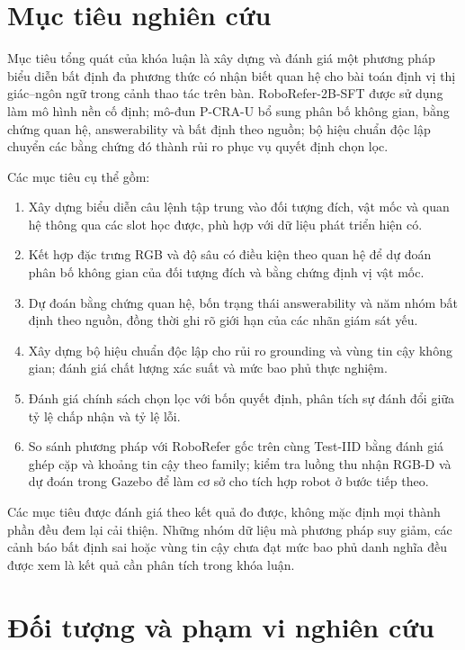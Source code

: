 \section{Mục tiêu nghiên cứu}
\label{sec:introduction-objectives}

Mục tiêu tổng quát của khóa luận là xây dựng và đánh giá một phương pháp biểu diễn bất định đa phương thức có nhận biết quan hệ cho bài toán định vị thị giác--ngôn ngữ trong cảnh thao tác trên bàn. RoboRefer-2B-SFT được sử dụng làm mô hình nền cố định; mô-đun P-CRA-U bổ sung phân bố không gian, bằng chứng quan hệ, answerability và bất định theo nguồn; bộ hiệu chuẩn độc lập chuyển các bằng chứng đó thành rủi ro phục vụ quyết định chọn lọc.

Các mục tiêu cụ thể gồm:
\begin{enumerate}
    \item Xây dựng biểu diễn câu lệnh tập trung vào đối tượng đích, vật mốc và quan hệ thông qua các slot học được, phù hợp với dữ liệu phát triển hiện có.
    \item Kết hợp đặc trưng RGB và độ sâu có điều kiện theo quan hệ để dự đoán phân bố không gian của đối tượng đích và bằng chứng định vị vật mốc.
    \item Dự đoán bằng chứng quan hệ, bốn trạng thái answerability và năm nhóm bất định theo nguồn, đồng thời ghi rõ giới hạn của các nhãn giám sát yếu.
    \item Xây dựng bộ hiệu chuẩn độc lập cho rủi ro grounding và vùng tin cậy không gian; đánh giá chất lượng xác suất và mức bao phủ thực nghiệm.
    \item Đánh giá chính sách chọn lọc với bốn quyết định, phân tích sự đánh đổi giữa tỷ lệ chấp nhận và tỷ lệ lỗi.
    \item So sánh phương pháp với RoboRefer gốc trên cùng Test-IID bằng đánh giá ghép cặp và khoảng tin cậy theo family; kiểm tra luồng thu nhận RGB-D và dự đoán trong Gazebo để làm cơ sở cho tích hợp robot ở bước tiếp theo.
\end{enumerate}

Các mục tiêu được đánh giá theo kết quả đo được, không mặc định mọi thành phần đều đem lại cải thiện. Những nhóm dữ liệu mà phương pháp suy giảm, các cảnh báo bất định sai hoặc vùng tin cậy chưa đạt mức bao phủ danh nghĩa đều được xem là kết quả cần phân tích trong khóa luận.

\section{Đối tượng và phạm vi nghiên cứu}
\label{sec:introduction-scope}

